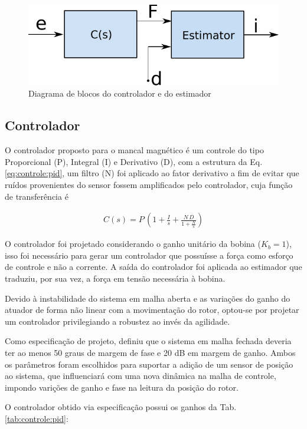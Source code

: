 \begin{figure}[ht!]
	\centering
	\includegraphics[width=0.5\linewidth]{Figs/Modelagem/controlador_estimador}
	\caption{Diagrama de blocos do controlador e do estimador}
	\label{fig:diagrama_controlador_estimador}
\end{figure}

\subsection{Controlador}

O controlador proposto para o mancal magnético é um controle do tipo Proporcional (P), Integral (I) e Derivativo (D), com a estrutura da Eq. \eqref{eq:controle:pid}, um filtro (N) foi aplicado ao fator derivativo a fim de evitar que ruídos provenientes do sensor fossem amplificados pelo controlador, cuja função de transferência é 

\begin{align}
	C(s) = P \, \left( 1 + \frac{I}{s} + \frac{N \, D}{ 1 + \frac{N}{s}} \right)
	\label{eq:controle:pid}
\end{align}

O controlador foi projetado considerando o ganho unitário da bobina ($K_b = 1$), isso foi necessário para gerar um controlador que possuísse a força como esforço de controle e não a corrente. A saída do controlador foi aplicada ao estimador que traduziu, por sua vez, a força em tensão necessária à bobina. 

Devido à instabilidade do sistema em malha aberta e as variações do ganho do atuador de forma não linear com a movimentação do rotor, optou-se por projetar um controlador privilegiando a robustez ao invés da agilidade.

Como especificação de projeto, definiu que o sistema em malha fechada deveria ter ao menos 50 graus de margem de fase e 20 dB em margem de ganho. Ambos os parâmetros foram escolhidos para suportar a adição de um sensor de posição ao sistema, que influenciará com uma nova dinâmica na malha de controle, impondo varições de ganho e fase na leitura da posição do rotor.

O controlador obtido via especificação possui os ganhos da Tab. \ref{tab:controle:pid}:


